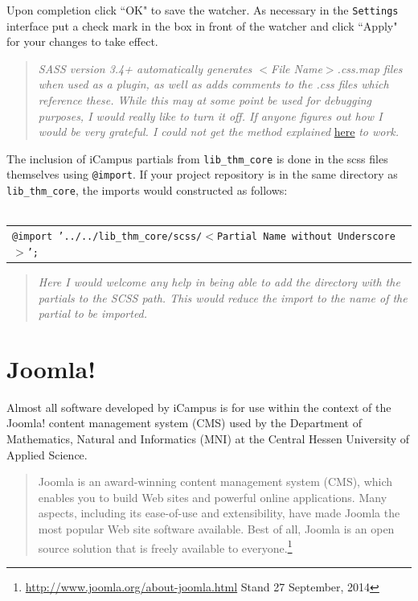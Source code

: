 \documentclass[]{report}
\begin{document}
\noindent
Upon completion click ``OK" to save the watcher. As necessary in the \texttt{Settings} interface put a check mark in the box in front of the watcher and click ``Apply" for your changes to take effect.

\newpage

\begin{quote}
	\emph{SASS version 3.4+ automatically generates $<$File Name$>$.css.map files when used as a plugin, as well as adds comments to the .css files which reference these. While this may at some point be used for debugging purposes, I would really like to turn it off. If anyone figures out how I would be very grateful. I could not get the method explained} \href{http://sass-lang.com/documentation/file.SASS\_CHANGELOG.html#341\_22_august\_2014}{here} \emph{to work.}
\end{quote}

\noindent
The inclusion of iCampus partials from \texttt{lib\_thm\_core} is done in the scss files themselves using \texttt{@import}. If your project repository is in the same directory as \texttt{lib\_thm\_core}, the imports would constructed as follows:\\
\\
\begin{tabular}{l}
	\texttt{@import '../../lib\_thm\_core/scss/$<$Partial Name without Underscore$>$';}
\end{tabular}

\begin{quote}
	\emph{Here I would welcome any help in being able to add the directory with the partials to the SCSS path. This would reduce the import to the name of the partial to be imported.}
\end{quote}

\newpage

\section{Joomla!}

Almost all software developed by iCampus is for use within the context of the Joomla! content management system (CMS) used by the Department of Mathematics, Natural and Informatics (MNI) at the Central Hessen University of Applied Science.

\begin{quote}
	Joomla is an award-winning content management system (CMS), which enables you to build Web sites and powerful online applications. Many aspects, including its ease-of-use and extensibility, have made Joomla the most popular Web site software available. Best of all, Joomla is an open source solution that is freely available to everyone.\footnote{\url{http://www.joomla.org/about-joomla.html} Stand 27 September, 2014}
\end{quote}
\end{document}
